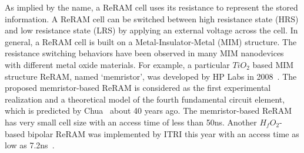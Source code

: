 
As implied by the name, a ReRAM cell uses its resistance to represent the
stored information. A ReRAM cell can be switched between high resistance
state (HRS) and low resistance state (LRS) by applying an external voltage
across the cell.
In general, a ReRAM cell is built on a Metal-Insulator-Metal (MIM)
structure. The resistance switching behaviors have been observed in many
MIM nanodevices with different metal oxide materials. For example, a
particular $TiO_2$ based MIM structure ReRAM, named `memristor', was
developed by HP Labs in 2008~\cite{memristor:missing}. The proposed
memristor-based ReRAM is considered as the first experimental realization
and a theoretical model of the fourth fundamental circuit element, which
is predicted by Chua~\cite{memristor:chua} about 40 years ago. The
memristor-based ReRAM has very small cell size with an access time of less
than 50ns.
Another $H_fO_2$-based bipolar ReRAM was implemented by ITRI this year with an access time as low as 7.2ns~\cite{ReRAM_ISSCC2011_Sheu}.


